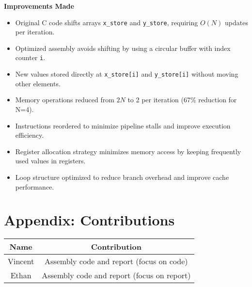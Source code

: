 \documentclass[12pt,a4paper]{article}
\begin{document}
\textbf{Improvements Made}
\begin{itemize}
\item Original C code shifts arrays \texttt{x\_store} and \texttt{y\_store}, requiring $O(N)$ updates per iteration.
\item Optimized assembly avoids shifting by using a circular buffer with index counter \texttt{i}.
\item New values stored directly at \texttt{x\_store[i]} and \texttt{y\_store[i]} without moving other elements.
\item Memory operations reduced from $2N$ to 2 per iteration (67\% reduction for N=4).
\item Instructions reordered to minimize pipeline stalls and improve execution efficiency.
\item Register allocation strategy minimizes memory access by keeping frequently used values in registers.
\item Loop structure optimized to reduce branch overhead and improve cache performance.
\end{itemize}

\section*{Appendix: Contributions}
\begin{tabular}{|c|c|}
\hline
Name & Contribution \\ \hline
Vincent & Assembly code and report (focus on code) \\ \hline
Ethan & Assembly code and report (focus on report) \\ \hline
\end{tabular}
\end{document}
